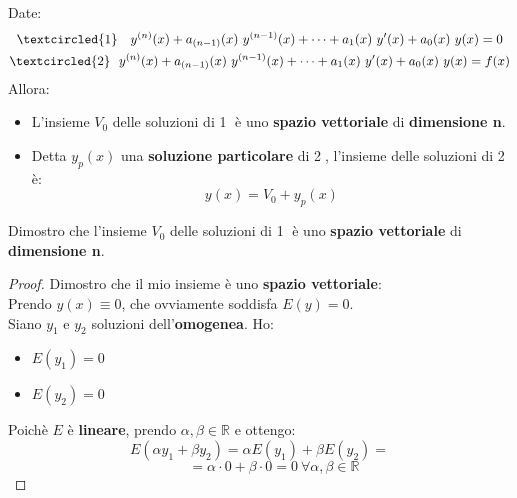 \documentclass[a4paper, oneside]{article}
\newcommand\R{\mathbb{R}}
\begin{document}
        \begin{theorem}
            Date:
            \begin{gather*}
                \textcircled{1} \quad y^{(n)}(x) + a_{(n-1)}(x) \ y^{(n-1)}(x) + \cdots + a_1(x) \ y'(x) + a_0(x) \ y(x) = 0\\
                \textcircled{2} \ \ y^{(n)}(x) + a_{(n-1)}(x) \ y^{(n-1)}(x) + \cdots + a_1(x) \ y'(x) + a_0(x) \ y(x) = f(x)
            \end{gather*}
            Allora:
            \begin{itemize}
                \item L'insieme $V_0$ delle soluzioni di \textcircled{1} è uno \textbf{spazio vettoriale} di \textbf{dimensione n}. 
                \item Detta $y_p(x)$ una \textbf{soluzione particolare} di \textcircled{2}, l'insieme delle soluzioni di \textcircled{2} è:
                \[y(x) = V_0 + y_p(x)\]
            \end{itemize}
            Dimostro che l'insieme $V_0$ delle soluzioni di \textcircled{1} è uno \textbf{spazio vettoriale} di \textbf{dimensione n}. 

            \begin{proof}
                Dimostro che il mio insieme è uno \textbf{spazio vettoriale}:\\
                Prendo $y(x)\equiv 0$, che ovviamente soddisfa $E(y) = 0$. \\
                Siano $y_1$ e $y_2$ soluzioni dell'\textbf{omogenea}. Ho:
                \begin{itemize}
                    \item $E(y_1) = 0$
                    \item $E(y_2) = 0$
                \end{itemize}
                Poichè $E$ è \textbf{lineare}, prendo $\alpha,\beta\in\R$ e ottengo:
                \[E(\alpha y_1 + \beta y_2) = \alpha E(y_1) + \beta E(y_2) =\]
                \[\quad\quad = \alpha\cdot 0 + \beta\cdot 0 = 0 \ \forall \alpha,\beta\in\R\]
            \end{proof}


\end{theorem}
\end{document}
